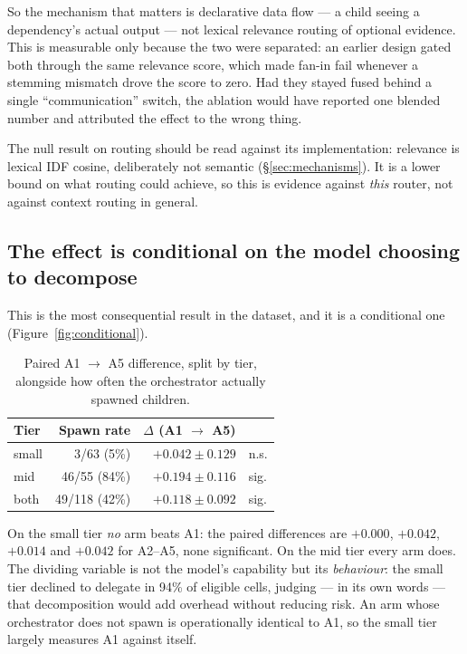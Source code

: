 \documentclass[10pt]{article}
\begin{document}
So the mechanism that matters is declarative data flow --- a child seeing a
dependency's actual output --- not lexical relevance routing of optional
evidence. This is measurable only because the two were separated: an earlier
design gated both through the same relevance score, which made fan-in fail
whenever a stemming mismatch drove the score to zero. Had they stayed fused
behind a single ``communication'' switch, the ablation would have reported one
blended number and attributed the effect to the wrong thing.

The null result on routing should be read against its implementation: relevance
is lexical IDF cosine, deliberately not semantic (\S\ref{sec:mechanisms}). It is
a lower bound on what routing could achieve, so this is evidence against
\emph{this} router, not against context routing in general.

\subsection{The effect is conditional on the model choosing to decompose}

This is the most consequential result in the dataset, and it is a conditional
one (Figure~\ref{fig:conditional}).

\begin{table}[t]
\centering
\caption{Paired A1 $\to$ A5 difference, split by tier, alongside how often the
orchestrator actually spawned children.}
\label{tab:bytier}
\begin{tabular}{lrrl}
\toprule
Tier & Spawn rate & $\Delta$ (A1 $\to$ A5) & \\
\midrule
small & 3/63 \phantom{0}(5\%) & $+0.042 \pm 0.129$ & n.s. \\
mid   & 46/55 (84\%)          & $+0.194 \pm 0.116$ & sig. \\
\midrule
both  & 49/118 (42\%)         & $+0.118 \pm 0.092$ & sig. \\
\bottomrule
\end{tabular}
\end{table}

On the small tier \emph{no} arm beats A1: the paired differences are $+0.000$,
$+0.042$, $+0.014$ and $+0.042$ for A2--A5, none significant. On the mid tier
every arm does. The dividing variable is not the model's capability but its
\emph{behaviour}: the small tier declined to delegate in 94\% of eligible cells, judging
--- in its own words --- that decomposition would add overhead without reducing
risk. An arm whose orchestrator does not spawn is operationally identical to A1,
so the small tier largely measures A1 against itself.
\end{document}
